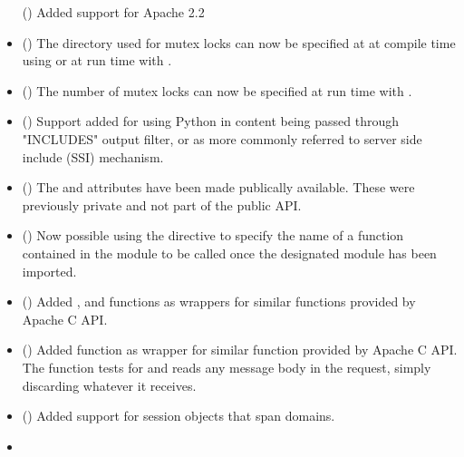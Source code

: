 \begin{itemize}
      ()
      Added support for Apache 2.2
    \item
      ()
      The directory used for mutex locks can now be specified at 
      at compile time using 
      or at run time with .
    \item
      ()
      The number of mutex locks can now be specified at run time with
      .
    \item
      ()
      Support added for using Python in content being passed through "INCLUDES"
      output filter, or as more commonly referred to server side include (SSI)
      mechanism.
    \item
      ()
      The  and  attributes
      have been made publically available. These were previously private and
      not part of the public API.
    \item
      ()
      Now possible using the  directive to specify the name
      of a function contained in the module to be called once the designated
      module has been imported.
    \item
      ()
      Added ,  and
       functions as wrappers for similar functions
      provided by Apache C API.
    \item
      ()
      Added  function as wrapper for
      similar function provided by Apache C API. The function tests for
      and reads any message body in the request, simply discarding
      whatever it receives.
    \item
      ()
      Added support for session objects that span domains.
    \item

\end{itemize}
